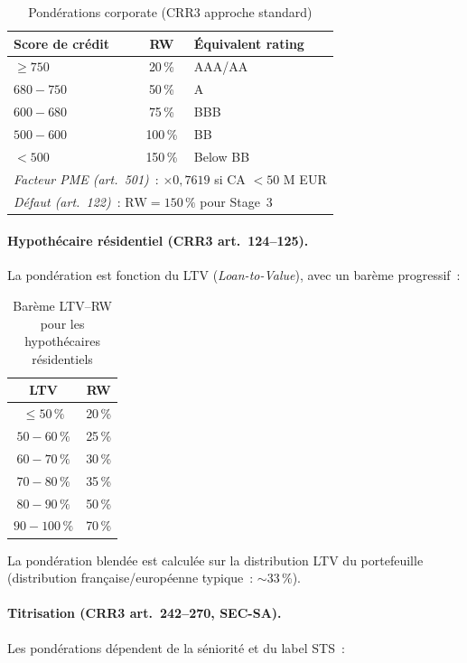 \documentclass[12pt, a4paper, twoside, openright]{report}
\theoremstyle{definition}
\begin{document}
\begin{table}[htbp]
\centering
\caption{Pondérations corporate (CRR3 approche standard)}
\label{tab:rw-corporate}
\begin{tabular}{lcl}
\toprule
Score de crédit & RW & Équivalent rating \\
\midrule
$\geq 750$ & 20\,\% & AAA/AA \\
$680 - 750$ & 50\,\% & A \\
$600 - 680$ & 75\,\% & BBB \\
$500 - 600$ & 100\,\% & BB \\
$< 500$ & 150\,\% & Below BB \\
\midrule
\multicolumn{3}{l}{\emph{Facteur PME (art.~501)}~: $\times 0{,}7619$ si CA $< 50$ M EUR} \\
\multicolumn{3}{l}{\emph{Défaut (art.~122)}~: $\text{RW} = 150\,\%$ pour Stage~3} \\
\bottomrule
\end{tabular}
\end{table}

\paragraph{Hypothécaire résidentiel (CRR3 art.~124--125).} La pondération est fonction du LTV (\emph{Loan-to-Value}), avec un barème progressif~:

\begin{table}[htbp]
\centering
\caption{Barème LTV--RW pour les hypothécaires résidentiels}
\label{tab:rw-ltv}
\begin{tabular}{cc}
\toprule
LTV & RW \\
\midrule
$\leq 50\,\%$ & 20\,\% \\
$50 - 60\,\%$ & 25\,\% \\
$60 - 70\,\%$ & 30\,\% \\
$70 - 80\,\%$ & 35\,\% \\
$80 - 90\,\%$ & 50\,\% \\
$90 - 100\,\%$ & 70\,\% \\
\bottomrule
\end{tabular}
\end{table}

La pondération blendée est calculée sur la distribution LTV du portefeuille (distribution française/européenne typique~: $\sim$33\,\%).

\paragraph{Titrisation (CRR3 art.~242--270, SEC-SA).} Les pondérations dépendent de la séniorité et du label STS~:
\end{document}
